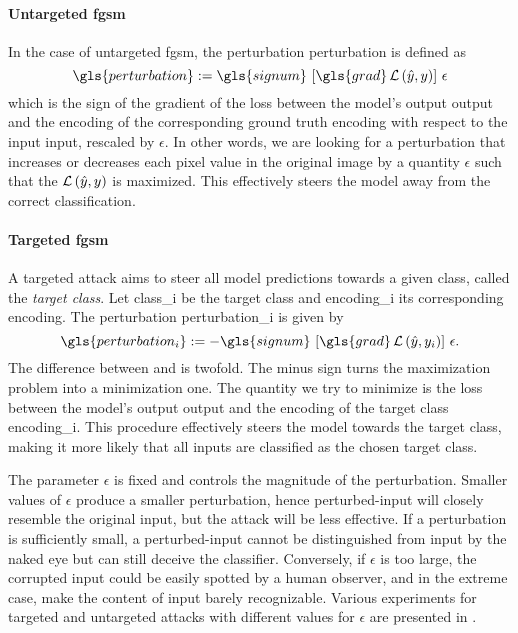 \paragraph{Untargeted \acrshort{fgsm}} In the case of untargeted \acrshort{fgsm}, the perturbation \gls{perturbation} is defined as
\begin{equation}
  \gls{perturbation} :=
  \gls{signum} \, \left[\gls{grad} \Loss\left(\hat{y}, y\right)\right] \, \epsilon
  \label{eq:untargeted-perturbation}
\end{equation}
which is the sign of the gradient of the loss between the model's output \gls{output} and the encoding of the corresponding ground truth \gls{encoding} with respect to the input \gls{input}, rescaled by $\epsilon$. In other words, we are looking for a perturbation that increases or decreases each pixel value in the original image by a quantity $\epsilon$ such that the $\operatorname{\mathcal{L}}\left(\hat{y}, y\right)$ is maximized. This effectively steers the model away from the correct classification.

\paragraph{Targeted \acrshort{fgsm}} A targeted attack aims to steer all model predictions towards a given class, called the \emph{target class}. Let \gls{class_i} be the target class and \gls{encoding_i} its corresponding encoding. The perturbation \gls{perturbation_i} is given by
\begin{equation}
  \gls{perturbation_i} :=
  - \gls{signum} \, \left[\gls{grad} \Loss\left(\hat{y}, y_i\right)\right] \, \epsilon.
  \label{eq:targeted-perturbation}
\end{equation}
The difference between  and  is twofold. The minus sign turns the maximization problem into a minimization one. The quantity we try to minimize is the loss between the model's output \gls{output} and the encoding of the target class \gls{encoding_i}. This procedure effectively steers the model towards the target class, making it more likely that all inputs are classified as the chosen target class.\medskip

The parameter $\epsilon$ is fixed and controls the magnitude of the perturbation. Smaller values of $\epsilon$ produce a smaller perturbation, hence \gls{perturbed-input} will closely resemble the original \gls{input}, but the attack will be less effective. If a perturbation is sufficiently small, a \gls{perturbed-input} cannot be distinguished from \gls{input} by the naked eye but can still deceive the classifier. Conversely, if $\epsilon$ is too large, the corrupted input could be easily spotted by a human observer, and in the extreme case, make the content of \gls{input} barely recognizable. Various experiments for targeted and untargeted attacks with different values for $\epsilon$ are presented in .\medskip

